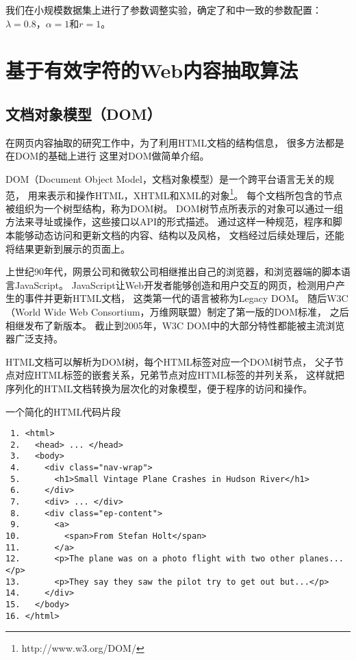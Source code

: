 我们在小规模数据集上进行了参数调整实验，确定了和\cite{wu2013web}中一致的参数配置：
$\lambda=0.8$，$\alpha=1$和$r=1$。

\section{基于有效字符的Web内容抽取算法}
\label{sec:cevc-method}

\subsection{文档对象模型（DOM）}
\label{subsec:dom}
在网页内容抽取的研究工作中，为了利用HTML文档的结构信息，
很多方法都是在DOM的基础上进行
这里对DOM做简单介绍。

DOM（Document Object Model，文档对象模型）是一个跨平台语言无关的规范，
用来表示和操作HTML，XHTML和XML的对象\footnote{http://www.w3.org/DOM/}。
每个文档所包含的节点被组织为一个树型结构，称为DOM树。
DOM树节点所表示的对象可以通过一组方法来寻址或操作，这些接口以API的形式描述。
通过这样一种规范，程序和脚本能够动态访问和更新文档的内容、结构以及风格，
文档经过后续处理后，还能将结果更新到展示的页面上。

上世纪90年代，网景公司和微软公司相继推出自己的浏览器，和浏览器端的脚本语言JavaScript。
JavaScript让Web开发者能够创造和用户交互的网页，检测用户产生的事件并更新HTML文档，
这类第一代的语言被称为Legacy DOM。
随后W3C（World Wide Web Consortium，万维网联盟）制定了第一版的DOM标准，
之后相继发布了新版本。
截止到2005年，W3C DOM中的大部分特性都能被主流浏览器广泛支持。

HTML文档可以解析为DOM树，每个HTML标签对应一个DOM树节点，
父子节点对应HTML标签的嵌套关系，兄弟节点对应HTML标签的并列关系，
这样就把序列化的HTML文档转换为层次化的对象模型，便于程序的访问和操作。

\begin{example}
\label{ex:html}
一个简化的HTML代码片段
\end{example}
\begin{oframed}
\begin{verbatim}
 1. <html>
 2.   <head> ... </head>
 3.   <body>
 4.     <div class="nav-wrap">
 5.       <h1>Small Vintage Plane Crashes in Hudson River</h1>
 6.     </div>
 7.     <div> ... </div>
 8.     <div class="ep-content">
 9.       <a>
10.         <span>From Stefan Holt</span>
11.       </a>
12.       <p>The plane was on a photo flight with two other planes...</p>
13.       <p>They say they saw the pilot try to get out but...</p>
14.     </div>
15.   </body>
16. </html>
\end{verbatim}
\end{oframed}

